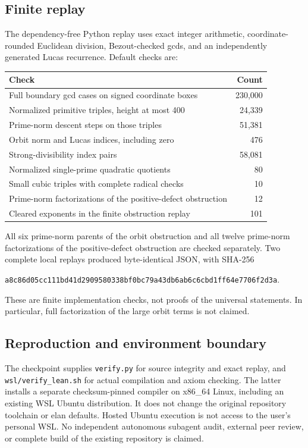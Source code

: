 \documentclass[11pt]{article}
\theoremstyle{definition}
\theoremstyle{remark}
\begin{document}
\subsection{Finite replay}
The dependency-free Python replay uses exact integer arithmetic, coordinate-rounded Euclidean division, Bezout-checked gcds, and an independently generated Lucas recurrence. Default checks are:
\begin{center}
\begin{tabular}{@{}lr@{}}
\toprule
Check & Count\\\midrule
Full boundary gcd cases on signed coordinate boxes & 230,000\\
Normalized primitive triples, height at most 400 & 24,339\\
Prime-norm descent steps on those triples & 51,381\\
Orbit norm and Lucas indices, including zero & 476\\
Strong-divisibility index pairs & 58,081\\
Normalized single-prime quadratic quotients & 80\\
Small cubic triples with complete radical checks & 10\\
Prime-norm factorizations of the positive-defect obstruction & 12\\
Cleared exponents in the finite obstruction replay & 101\\\bottomrule
\end{tabular}
\end{center}
All six prime-norm parents of the orbit obstruction and all twelve prime-norm factorizations of the positive-defect obstruction are checked separately. Two complete local replays produced byte-identical JSON, with SHA-256
\begin{center}\small\texttt{a8c86d05cc111bd41d2909580338bf0bc79a43db6ab6c6cbd1ff64e7706f2d3a}.\end{center}
These are finite implementation checks, not proofs of the universal statements. In particular, full factorization of the large orbit terms is not claimed.

\subsection{Reproduction and environment boundary}
The checkpoint supplies \texttt{verify.py} for source integrity and exact replay, and \texttt{wsl/verify\_lean.sh} for actual compilation and axiom checking. The latter installs a separate checksum-pinned compiler on x86\_64 Linux, including an existing WSL Ubuntu distribution. It does not change the original repository toolchain or elan defaults. Hosted Ubuntu execution is not access to the user's personal WSL. No independent autonomous subagent audit, external peer review, or complete build of the existing repository is claimed.
\end{document}
